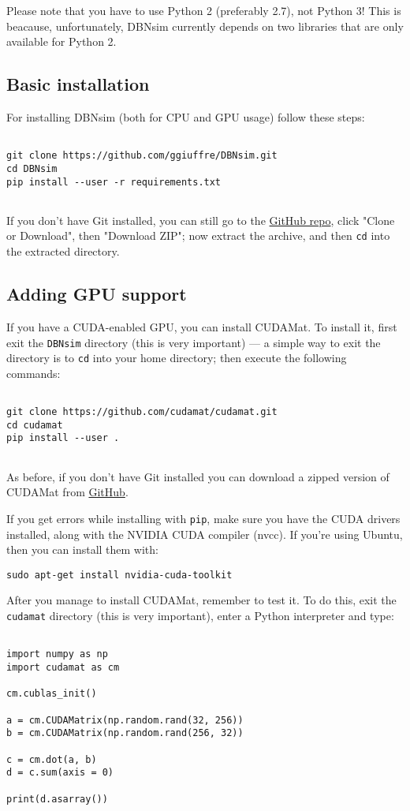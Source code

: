 \documentclass[a4paper]{article}
\begin{document}
		
Please note that you have to use Python 2 (preferably 2.7), not Python 3! This is beacause, unfortunately, DBNsim currently depends on two libraries that are only available for Python 2.

		
	\subsection{Basic installation}

		
For installing DBNsim (both for CPU and GPU usage) follow these steps:
		\begin{verbatim}

git clone https://github.com/ggiuffre/DBNsim.git
cd DBNsim
pip install --user -r requirements.txt
		
\end{verbatim}

		
If you don't have Git installed, you can still go to the \href{https://github.com/ggiuffre/DBNsim}{GitHub repo}, click "Clone or Download", then "Download ZIP"; now extract the archive, and then \texttt{cd} into the extracted directory.

		
	\subsection{Adding GPU support}

		
If you have a CUDA-enabled GPU, you can install CUDAMat. To install it, first exit the \texttt{DBNsim} directory (this is very important) --- a simple way to exit the directory is to \texttt{cd} into your home directory; then execute the following commands:
		\begin{verbatim}

git clone https://github.com/cudamat/cudamat.git
cd cudamat
pip install --user .
		
\end{verbatim}

		
As before, if you don't have Git installed you can download a zipped version of CUDAMat from \href{https://github.com/cudamat/cudamat}{GitHub}.
		
If you get errors while installing with \texttt{pip}, make sure you have the CUDA drivers installed, along with the NVIDIA CUDA compiler (nvcc). If you're using Ubuntu, then you can install them with:
		\begin{verbatim}
sudo apt-get install nvidia-cuda-toolkit
\end{verbatim}

		
After you manage to install CUDAMat, remember to test it. To do this, exit the \texttt{cudamat} directory (this is very important), enter a Python interpreter and type:
		\begin{verbatim}

import numpy as np
import cudamat as cm

cm.cublas_init()

a = cm.CUDAMatrix(np.random.rand(32, 256))
b = cm.CUDAMatrix(np.random.rand(256, 32))

c = cm.dot(a, b)
d = c.sum(axis = 0)

print(d.asarray())
		
\end{verbatim}
\end{document}
